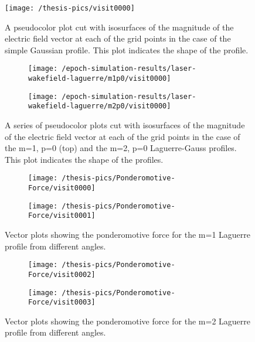 \documentclass[12pt, class=report, crop=false]{standalone}
\begin{document}
\begin{figure}[!h]
  \centering
  \texttt{[image: /thesis-pics/visit0000]}%
  \caption{A pseudocolor plot cut with isosurfaces of the magnitude of the electric field vector at each of the grid points in the case of the simple Gaussian profile. This plot indicates the shape of the profile.}
  \label{fig:laserbeam-gauss}%
\end{figure}

\begin{figure}[!h]
  \centering
  \begin{subfigure}[t]{0.6\textwidth}
    \centering
    \texttt{[image: /epoch-simulation-results/laser-wakefield-laguerre/m1p0/visit0000]}
  \end{subfigure}
  \hfill
  \begin{subfigure}[t]{0.6\textwidth}
    \centering
    \texttt{[image: /epoch-simulation-results/laser-wakefield-laguerre/m2p0/visit0000]}
  \end{subfigure}
  \caption{A series of pseudocolor plots cut with isosurfaces of the magnitude of the electric field vector at each of the grid points in the case of the m=1, p=0 (top) and the m=2, p=0 Laguerre-Gauss profiles. This plot indicates the shape of the profiles.}%
  \label{fig:laserbeam-laguerre}%
\end{figure}

\begin{figure}[!h]
  \centering
  \begin{subfigure}[t]{0.85\textwidth}
    \centering
    \texttt{[image: /thesis-pics/Ponderomotive-Force/visit0000]}
  \end{subfigure}
  \hfill
  \begin{subfigure}[t]{0.85\textwidth}
    \centering
    \texttt{[image: /thesis-pics/Ponderomotive-Force/visit0001]}
  \end{subfigure}
  \caption{Vector plots showing the ponderomotive force for the m=1 Laguerre profile from different angles.}
  \label{fig:ponderomotive-force-1}%
\end{figure}

\begin{figure}[!h]
  \centering
  \begin{subfigure}[t]{0.85\textwidth}
    \centering
    \texttt{[image: /thesis-pics/Ponderomotive-Force/visit0002]}
  \end{subfigure}
  \hfill
  \begin{subfigure}[t]{0.85\textwidth}
    \centering
    \texttt{[image: /thesis-pics/Ponderomotive-Force/visit0003]}
  \end{subfigure}
  \caption{Vector plots showing the ponderomotive force for the m=2 Laguerre profile from different angles.}
  \label{fig:ponderomotive-force-2}%
\end{figure}
\end{document}
